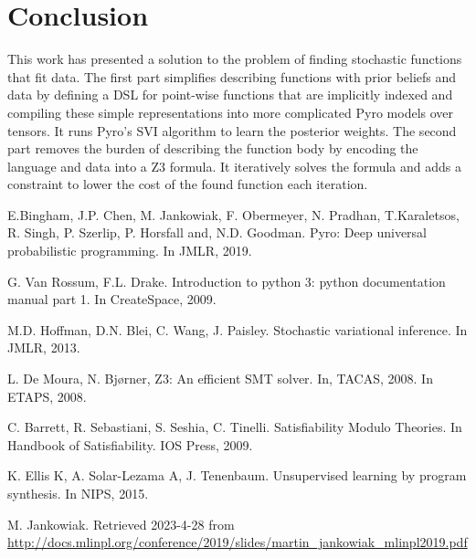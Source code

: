 \documentclass[runningheads]{llncs}
\begin{document}
\section{Conclusion}
This work has presented a solution to the problem of finding stochastic functions that fit data.
The first part simplifies describing functions with prior beliefs and data by defining a DSL for
point-wise functions that are implicitly indexed and compiling these simple representations
into more complicated Pyro models over tensors. It runs Pyro's SVI algorithm to learn the posterior weights. 
The second part removes the burden of describing the function body by encoding the language and data into a Z3 formula. 
It iteratively solves the formula and adds a constraint to lower the cost of the found function each iteration.  

\newpage

\begin{thebibliography}{9}

E.Bingham, J.P. Chen, M. Jankowiak, F. Obermeyer, N. Pradhan, T.Karaletsos, R. Singh, P. Szerlip, P. Horsfall and, N.D. Goodman. Pyro: Deep universal probabilistic programming. In JMLR, 2019. 

G. Van Rossum, F.L. Drake. Introduction to python 3: python documentation manual part 1. In CreateSpace, 2009.

M.D. Hoffman, D.N. Blei, C. Wang, J. Paisley. Stochastic variational inference. In JMLR, 2013.

L. De Moura, N. Bjørner, Z3: An efficient SMT solver. In, TACAS, 2008. In ETAPS, 2008.

C. Barrett, R. Sebastiani, S. Seshia, C. Tinelli. Satisfiability Modulo Theories. In
Handbook of Satisfiability. IOS Press, 2009.

K. Ellis K, A. Solar-Lezama A, J. Tenenbaum. Unsupervised learning by program synthesis. In NIPS, 2015.

M. Jankowiak. Retrieved 2023-4-28 from \url{http://docs.mlinpl.org/conference/2019/slides/martin_jankowiak_mlinpl2019.pdf} 


\end{thebibliography}
\end{document}
